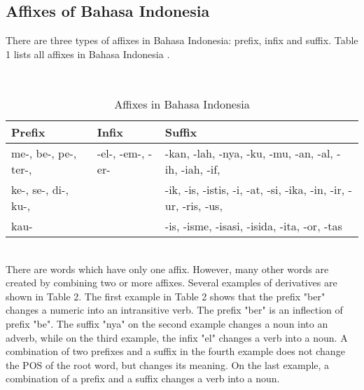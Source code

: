 \documentclass[english]{nlp}
\begin{document}
\subsection{Affixes of Bahasa Indonesia}
There are three types of affixes in Bahasa Indonesia: prefix, infix 
and suffix. Table 1 lists all affixes in Bahasa Indonesia \cite{Kridalaksana96}.
~\\\vspace{-10mm}
\begin{table}[ht]
\begin{center}
\caption{Affixes in Bahasa Indonesia}
~\\\vspace{-2mm}
\label{table:affixes}
\begin{tabular}{lll}
\hline
Prefix & Infix & Suffix\\
\hline
me-, be-, pe-, ter-, & -el-, -em-, -er- & -kan, -lah, -nya, 
-ku, -mu, -an, -al, -ih, -iah, -if,\\
ke-, se-, di-, ku-, & & -ik, -is, -istis, -i, -at, -si, -ika, -in, 
-ir, -ur, -ris, -us,\\
kau- & & -is, -isme, -isasi, -isida, -ita, -or, -tas \\
\hline
\end{tabular}
\end{center}
\end{table}
\\There are words which have only one affix. However, many other words are
created by combining two or more affixes.
Several examples of derivatives are shown in Table 2.
The first example in Table 2 shows that the prefix "ber" changes 
a numeric into an intransitive verb.
The prefix "ber" is an inflection of prefix "be".
The suffix "nya" on the second example changes a noun into an adverb,
while on the third example, the infix "el" changes a verb into a noun.
A combination of two prefixes and a suffix in the fourth example 
does not change the POS of the root word, but 
changes its meaning. On the last example, a combination of a 
prefix and a suffix changes a verb into a noun.\\
~\\\vspace{-10mm}
\end{document}
